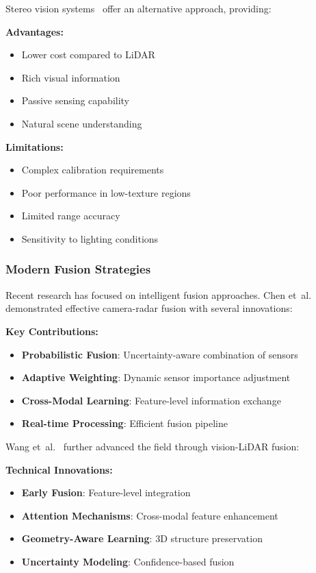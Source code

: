 \documentclass[12pt,oneside]{book}
\begin{document}
Stereo vision systems~\cite{menze2015joint} offer an alternative approach, providing:

\textbf{Advantages:}
\begin{itemize}
    \item Lower cost compared to LiDAR
    \item Rich visual information
    \item Passive sensing capability
    \item Natural scene understanding
\end{itemize}

\textbf{Limitations:}
\begin{itemize}
    \item Complex calibration requirements
    \item Poor performance in low-texture regions
    \item Limited range accuracy
    \item Sensitivity to lighting conditions
\end{itemize}

\subsubsection{Modern Fusion Strategies}
Recent research has focused on intelligent fusion approaches. Chen et~al.~\cite{chen2020multi} demonstrated effective camera-radar fusion with several innovations:

\textbf{Key Contributions:}
\begin{itemize}
    \item \textbf{Probabilistic Fusion}: Uncertainty-aware combination of sensors
    \item \textbf{Adaptive Weighting}: Dynamic sensor importance adjustment
    \item \textbf{Cross-Modal Learning}: Feature-level information exchange
    \item \textbf{Real-time Processing}: Efficient fusion pipeline
\end{itemize}

Wang et~al.~\cite{wang2021multi} further advanced the field through vision-LiDAR fusion:

\textbf{Technical Innovations:}
\begin{itemize}
    \item \textbf{Early Fusion}: Feature-level integration
    \item \textbf{Attention Mechanisms}: Cross-modal feature enhancement
    \item \textbf{Geometry-Aware Learning}: 3D structure preservation
    \item \textbf{Uncertainty Modeling}: Confidence-based fusion
\end{itemize}
\end{document}
